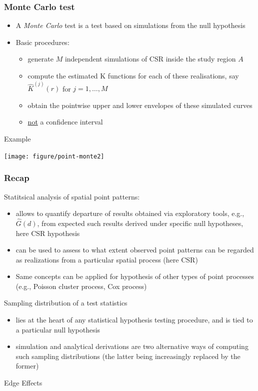 \documentclass[10pt]{beamer}\usepackage[]{graphicx}\usepackage[]{color}
\newenvironment{knitrout}{}{} %
\newcommand{\bitemize}{\begin{itemize}}
\newcommand{\eitemize}{\end{itemize}}
\newcommand{\bblock}{\begin{block}}
\newcommand{\eblock}{\end{block}}
\begin{document}
\begin{frame}
\frametitle{Monte Carlo test}

\bitemize 
\item A {\it Monte Carlo} test is a test based on simulations from the null hypothesis 
\item Basic procedures:
\bitemize
\item generate $M$ independent simulations of CSR inside the study region $A$ 
\item compute the estimated K functions for each of these realisations, say $\hat{K}^{(j)}(r)$ for $j = 1, \ldots ,M$
\item obtain the pointwise upper and lower envelopes of these simulated curves
\item \underline{not} a confidence interval
\eitemize
\eitemize

\bblock{Example}
\begin{knitrout}
\color{fgcolor}

{\centering \texttt{[image: figure/point-monte2]} 

}



\end{knitrout}


\eblock
\end{frame}
\begin{frame}
\frametitle{Recap}

\bblock{Statitsical analysis of spatial point patterns:}
\bitemize
\item allows to quantify departure of results obtained via exploratory tools, e.g., $\hat{G}(d)$, from expected such results derived
under specific null hypotheses, here CSR hypothesis
\item can be used to assess to what extent observed point patterns can
be regarded as realizations from a particular spatial process (here CSR)
\item Same concepts can be applied for hypothesis of other types of point processes (e.g., Poisson cluster process, Cox process)
\eitemize
\eblock

\bblock{Sampling distribution of a test statistics}
\bitemize
\item lies at the heart of any statistical hypothesis testing procedure,
and is tied to a particular null hypothesis 
\item simulation and analytical derivations are two alternative ways of
computing such sampling distributions (the latter being increasingly replaced by the former)
\eitemize
\eblock

\bblock{Edge Effects}
\eblock

\end{frame}

\end{document}
